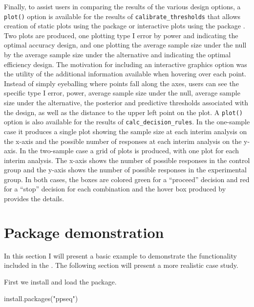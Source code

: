 Finally, to assist users in comparing the results of the various design
options, a \texttt{plot()} option is available for the results of
\texttt{calibrate\_thresholds} that allows creation of static plots
using the  package \citep{Wickham2016} or interactive
plots using the  package \citep{Sievert2020}. Two plots
are produced, one plotting type I error by power and indicating the
optimal accuracy design, and one plotting the average sample size under
the null by the average sample size under the alternative and indicating
the optimal efficiency design. The motivation for including an
interactive graphics option was the utility of the additional
information available when hovering over each point. Instead of simply
eyeballing where points fall along the axes, users can see the specific
type I error, power, average sample size under the null, average sample
size under the alternative, the posterior and predictive thresholds
associated with the design, as well as the distance to the upper left
point on the plot. A \texttt{plot()} option is also available for the
results of \texttt{calc\_decision\_rules}. In the one-sample case it
produces a single plot showing the sample size at each interim analysis
on the x-axis and the possible number of responses at each interim
analysis on the y-axis. In the two-sample case a grid of plots is
produced, with one plot for each interim analysis. The x-axis shows the
number of possible responses in the control group and the y-axis shows
the number of possible responses in the experimental group. In both
cases, the boxes are colored green for a ``proceed'' decision and red
for a ``stop'' decision for each combination and the hover box produced
by  provides the details.

\hypertarget{package-demonstration}{%
\section{Package demonstration}\label{package-demonstration}}

In this section I will present a basic example to demonstrate the
functionality included in the . The following section
will present a more realistic case study.

First we install and load the  package.

\begin{Schunk}
\begin{Sinput}
install.packages("ppseq")
\end{Sinput}
\end{Schunk}

